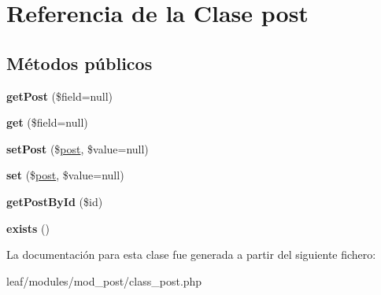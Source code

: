 \hypertarget{classpost}{\section{Referencia de la Clase post}
\label{classpost}
}
\subsection*{Métodos públicos}
\begin{DoxyCompactItemize}
\item 
\hypertarget{classpost_aadce3b50b56c9886eadc49070aa287aa}{{\bfseries get\-Post} (\$field=null)}\label{classpost_aadce3b50b56c9886eadc49070aa287aa}

\item 
\hypertarget{classpost_a1a1834e5e126d184909785c0a0fdda69}{{\bfseries get} (\$field=null)}\label{classpost_a1a1834e5e126d184909785c0a0fdda69}

\item 
\hypertarget{classpost_ad6028f6a797c5b513de1ad725a96b14e}{{\bfseries set\-Post} (\$\hyperlink{classpost}{post}, \$value=null)}\label{classpost_ad6028f6a797c5b513de1ad725a96b14e}

\item 
\hypertarget{classpost_ab793c08e4817cc10cc6a772b2c8b83dc}{{\bfseries set} (\$\hyperlink{classpost}{post}, \$value=null)}\label{classpost_ab793c08e4817cc10cc6a772b2c8b83dc}

\item 
\hypertarget{classpost_a9f8626dd0a95290930259e24fbbf35f5}{{\bfseries get\-Post\-By\-Id} (\$id)}\label{classpost_a9f8626dd0a95290930259e24fbbf35f5}

\item 
\hypertarget{classpost_ac2f864b72dc2f778e68ad96364c48c5e}{{\bfseries exists} ()}\label{classpost_ac2f864b72dc2f778e68ad96364c48c5e}

\end{DoxyCompactItemize}


La documentación para esta clase fue generada a partir del siguiente fichero\-:\begin{DoxyCompactItemize}
\item 
leaf/modules/mod\-\_\-post/class\-\_\-post.\-php\end{DoxyCompactItemize}
